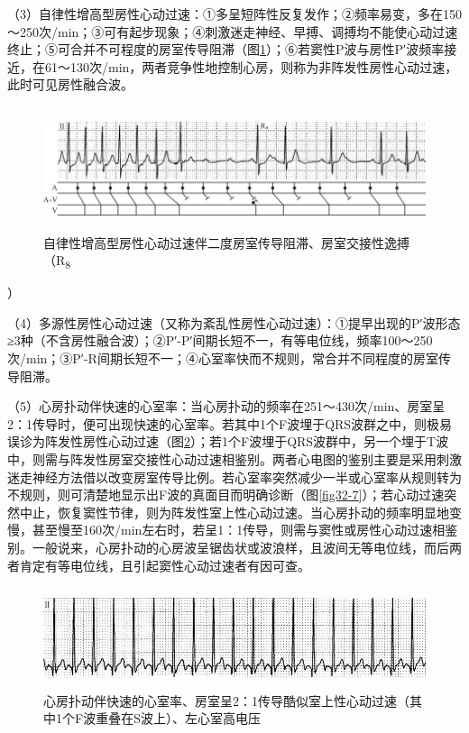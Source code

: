（3）自律性增高型房性心动过速：①多呈短阵性反复发作；②频率易变，多在150～250次/min；③可有起步现象；④刺激迷走神经、早搏、调搏均不能使心动过速终止；⑤可合并不可程度的房室传导阻滞（图\ref{fig32-5}）；⑥若窦性P波与房性P′波频率接近，在61～130次/min，两者竞争性地控制心房，则称为非阵发性房性心动过速，此时可见房性融合波。

\begin{figure}[!htbp]
 \centering
 \includegraphics[width=5.80208in,height=1.42708in]{./images/Image00521.jpg}
 \captionsetup{justification=centering}
 \caption{自律性增高型房性心动过速伴二度房室传导阻滞、房室交接性逸搏（R\textsubscript{8}}
 \label{fig32-5}
  \end{figure} 
）

（4）多源性房性心动过速（又称为紊乱性房性心动过速）：①提早出现的P′波形态≥3种（不含房性融合波）；②P′-P′间期长短不一，有等电位线，频率100～250次/min；③P′-R间期长短不一；④心室率快而不规则，常合并不同程度的房室传导阻滞。

（5）心房扑动伴快速的心室率：当心房扑动的频率在251～430次/min、房室呈2：1传导时，便可出现快速的心室率。若其中1个F波埋于QRS波群之中，则极易误诊为阵发性房性心动过速（图\ref{fig32-6}）；若1个F波埋于QRS波群中，另一个埋于T波中，则需与阵发性房室交接性心动过速相鉴别。两者心电图的鉴别主要是采用刺激迷走神经方法借以改变房室传导比例。若心室率突然减少一半或心室率从规则转为不规则，则可清楚地显示出F波的真面目而明确诊断（图\ref{fig32-7}）；若心动过速突然中止，恢复窦性节律，则为阵发性室上性心动过速。当心房扑动的频率明显地变慢，甚至慢至160次/min左右时，若呈1：1传导，则需与窦性或房性心动过速相鉴别。一般说来，心房扑动的心房波呈锯齿状或波浪样，且波间无等电位线，而后两者肯定有等电位线，且引起窦性心动过速者有因可查。

\begin{figure}[!htbp]
 \centering
 \includegraphics[width=5.58333in,height=1.16667in]{./images/Image00522.jpg}
 \captionsetup{justification=centering}
 \caption{心房扑动伴快速的心室率、房室呈2：1传导酷似室上性心动过速（其中1个F波重叠在S波上）、左心室高电压}
 \label{fig32-6}
  \end{figure} 

